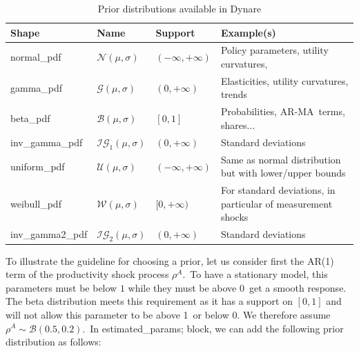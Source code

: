 \documentclass[a4paper,12pt]{article}%
\begin{document}
\begin{table}%


\begin{center}%
\begin{tabular}
[c]{llll}%
Shape & Name & Support & Example(s)\\\hline\hline
\textsf{normal\_pdf} & $\mathcal{N}\left(  \mu,\sigma\right)  $ & $\left(
-\infty,+\infty\right)  $ & Policy parameters, utility curvatures,\\
\textsf{gamma\_pdf} & $\mathcal{G}\left(  \mu,\sigma\right)  $ & $\left(
0,+\infty\right)  $ & Elasticities, utility curvatures, trends\\
\textsf{beta\_pdf} & $\mathcal{B}\left(  \mu,\sigma\right)  $ & $\left[
0,1\right]  $ & Probabilities, AR-MA\ terms, shares...\\
\textsf{inv\_gamma\_pdf} & $\mathcal{IG}_{1}\left(  \mu,\sigma\right)  $ &
$\left(  0,+\infty\right)  $ & Standard deviations\\
\textsf{uniform\_pdf} & $\mathcal{U}\left(  \mu,\sigma\right)  $ & $\left(
-\infty,+\infty\right)  $ & Same as normal distribution but with lower/upper
bounds\\
\textsf{weibull\_pdf} & $\mathcal{W}\left(  \mu,\sigma\right)  $ &
$[0,+\infty)$ & For standard deviations, in particular of measurement shocks\\
\textsf{inv\_gamma2\_pdf} & $\mathcal{IG}_{2}\left(  \mu,\sigma\right)  $ &
$\left(  0,+\infty\right)  $ & Standard deviations\\\hline\hline
\end{tabular}



\end{center}

%

\caption{Prior distributions available in Dynare \label{table priors}}%
\end{table}%


To illustrate the guideline for choosing a prior, let us consider first the
AR(1) term of the productivity shock process $\rho^{A}$.\ To have a stationary
model, this parameters must be below $1$ while they must be above 0\ get a
smooth response. The beta distribution meets this requirement as it has a
support on $\left[  0,1\right]  $ and will not allow this parameter to be
above 1\ or below 0. We therefore assume $\rho^{A}\sim\mathcal{B}%
(0.5,0.2)$.\ In \textsf{estimated\_params;} block, we can add the following
prior distribution as follows:%
\end{document}
